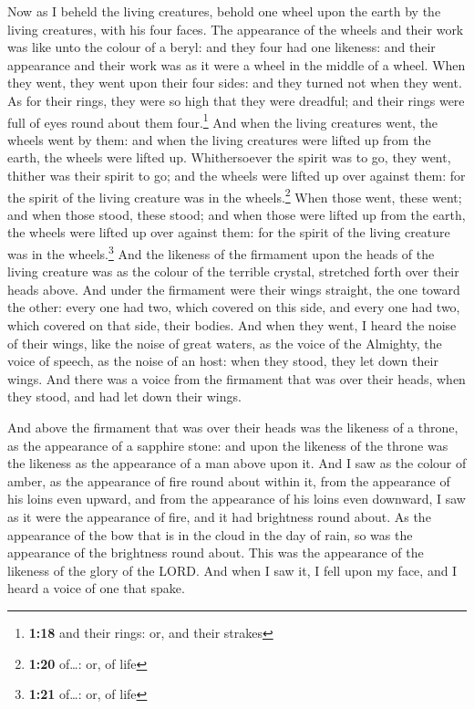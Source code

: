  Now as I beheld the living creatures, behold one wheel
upon the earth by the living creatures, with his four faces.
 The appearance of the wheels and their work was like
unto the colour of a beryl: and they four had one likeness: and their
appearance and their work was as it were a wheel in the middle of a
wheel.  When they went, they went upon their four sides:
and they turned not when they went.  As for their rings,
they were so high that they were dreadful; and their rings were full of
eyes round about them four.\footnote{\textbf{1:18} and their rings: or,
  and their strakes}  And when the living creatures went,
the wheels went by them: and when the living creatures were lifted up
from the earth, the wheels were lifted up.  Whithersoever
the spirit was to go, they went, thither was their spirit to go; and the
wheels were lifted up over against them: for the spirit of the living
creature was in the wheels.\footnote{\textbf{1:20} of\ldots: or, of life}
 When those went, these went; and when those stood, these
stood; and when those were lifted up from the earth, the wheels were
lifted up over against them: for the spirit of the living creature was
in the wheels.\footnote{\textbf{1:21} of\ldots: or, of life}
 And the likeness of the firmament upon the heads of the
living creature was as the colour of the terrible crystal, stretched
forth over their heads above.  And under the firmament
were their wings straight, the one toward the other: every one had two,
which covered on this side, and every one had two, which covered on that
side, their bodies.  And when they went, I heard the
noise of their wings, like the noise of great waters, as the voice of
the Almighty, the voice of speech, as the noise of an host: when they
stood, they let down their wings.  And there was a voice
from the firmament that was over their heads, when they stood, and had
let down their wings.

 And above the firmament that was over their heads was
the likeness of a throne, as the appearance of a sapphire stone: and
upon the likeness of the throne was the likeness as the appearance of a
man above upon it.  And I saw as the colour of amber, as
the appearance of fire round about within it, from the appearance of his
loins even upward, and from the appearance of his loins even downward, I
saw as it were the appearance of fire, and it had brightness round
about.  As the appearance of the bow that is in the cloud
in the day of rain, so was the appearance of the brightness round about.
This was the appearance of the likeness of the glory of the LORD. And
when I saw it, I fell upon my face, and I heard a voice of one that
spake.

